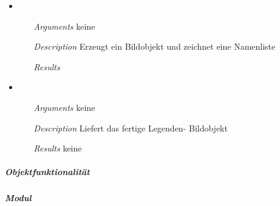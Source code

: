 \begin{itemize}
\item {}
\begin{enumerate}
\item[\textit{Arguments}] keine
\item[\textit{Description}] Erzeugt ein Bildobjekt und zeichnet eine
  Namenliste
\item[\textit{Results}] 
\end{enumerate}

\item {}
\begin{enumerate}
\item[\textit{Arguments}] keine
\item[\textit{Description}] Liefert das fertige Legenden- Bildobjekt
\item[\textit{Results}] keine
\end{enumerate}

\end{itemize}


\newpage

\subparagraph{Objektfunktionalit\"at}


\newpage

\paragraph{}
\subparagraph{Modul} 

